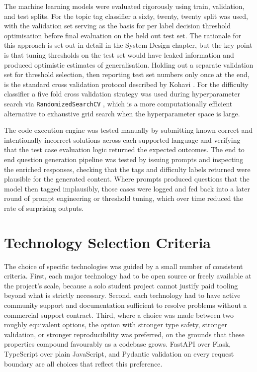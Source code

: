 The machine learning models were evaluated rigorously using train,
validation, and test splits. For the topic tag classifier a sixty, twenty,
twenty split was used, with the validation set serving as the basis for
per label decision threshold optimisation before final evaluation on the
held out test set. The rationale for this approach is set out in detail
in the System Design chapter, but the key point is that tuning thresholds
on the test set would have leaked information and produced optimistic
estimates of generalisation. Holding out a separate validation set for
threshold selection, then reporting test set numbers only once at the
end, is the standard cross validation protocol described by Kohavi
\cite{kohavi1995crossval}. For the difficulty classifier a five fold cross
validation strategy was used during hyperparameter search via
\texttt{RandomizedSearchCV} \cite{bergstra2012random}, which is a more
computationally efficient alternative to exhaustive grid search when the
hyperparameter space is large.

The code execution engine was tested manually by submitting known correct
and intentionally incorrect solutions across each supported language and
verifying that the test case evaluation logic returned the expected
outcomes. The end to end question generation pipeline was tested by
issuing prompts and inspecting the enriched responses, checking that the
tags and difficulty labels returned were plausible for the generated
content. Where prompts produced questions that the model then tagged
implausibly, those cases were logged and fed back into a later round of
prompt engineering or threshold tuning, which over time reduced the rate
of surprising outputs.

\section{Technology Selection Criteria}

The choice of specific technologies was guided by a small number of
consistent criteria. First, each major technology had to be open source
or freely available at the project's scale, because a solo student project
cannot justify paid tooling beyond what is strictly necessary. Second,
each technology had to have active community support and documentation
sufficient to resolve problems without a commercial support contract.
Third, where a choice was made between two roughly equivalent options,
the option with stronger type safety, stronger validation, or stronger
reproducibility was preferred, on the grounds that these properties
compound favourably as a codebase grows. FastAPI over Flask, TypeScript
over plain JavaScript, and Pydantic validation on every request boundary
are all choices that reflect this preference.